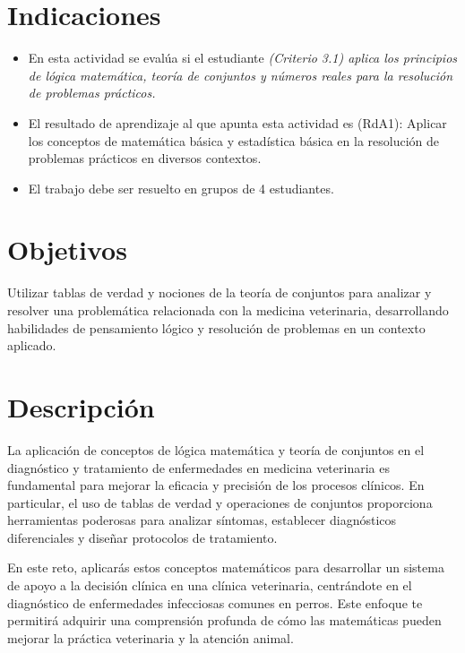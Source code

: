 \documentclass[a4,11pt]{aleph-notas}
\begin{document}
\encabezado

\section*{Indicaciones}
\begin{itemize}[leftmargin=*]
\item 
    En esta actividad se evalúa si el estudiante \textit{(Criterio 3.1) aplica los principios de lógica matemática, teoría de conjuntos y números reales para la resolución de problemas prácticos.}
\item 
    El resultado de aprendizaje al que apunta esta actividad es (RdA1): Aplicar los conceptos de matemática básica y estadística básica en la resolución de problemas prácticos en diversos contextos.
\item 
    El trabajo debe ser resuelto en grupos de 4 estudiantes.
\end{itemize}


\section{Objetivos}

Utilizar tablas de verdad y nociones de la teoría de conjuntos para analizar y resolver una problemática relacionada con la medicina veterinaria, desarrollando habilidades de pensamiento lógico y resolución de problemas en un contexto aplicado.

\section{Descripción}

La aplicación de conceptos de lógica matemática y teoría de conjuntos en el diagnóstico y tratamiento de enfermedades en medicina veterinaria es fundamental para mejorar la eficacia y precisión de los procesos clínicos. En particular, el uso de tablas de verdad y operaciones de conjuntos proporciona herramientas poderosas para analizar síntomas, establecer diagnósticos diferenciales y diseñar protocolos de tratamiento. 

En este reto, aplicarás estos conceptos matemáticos para desarrollar un sistema de apoyo a la decisión clínica en una clínica veterinaria, centrándote en el diagnóstico de enfermedades infecciosas comunes en perros. Este enfoque te permitirá adquirir una comprensión profunda de cómo las matemáticas pueden mejorar la práctica veterinaria y la atención animal.
\end{document}
